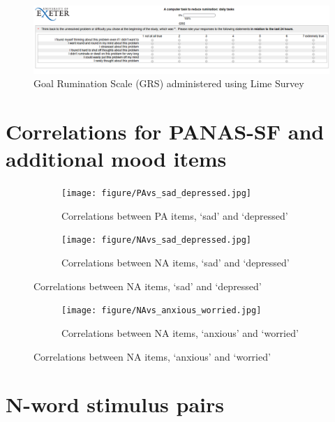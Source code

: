 \documentclass[man,floatsintext,a4paper,biblatex]{apa6}\usepackage[]{graphicx}\usepackage[]{color}
\begin{document}
\begin{figure}
\includegraphics[width=250mm]{figure/grs.png}
\caption{Goal Rumination Scale (GRS) administered using Lime Survey}
\end{figure}

\section{Correlations for PANAS-SF and additional mood items}
\label{app:mood}

\begin{figure}[!htbp]
\caption{Correlations PANAS-SF and additional items `sad',`depressed',`anxious',`worried'.}
\centering
  \begin{subfigure}[!htbp]{\textwidth}
    \texttt{[image: figure/PAvs\_sad\_depressed.jpg]}
    \caption{Correlations between PA items, `sad' and `depressed'}
  \end{subfigure}
  \begin{subfigure}[!htbp]{\textwidth}
    \texttt{[image: figure/NAvs\_sad\_depressed.jpg]}
    \caption{Correlations between NA items, `sad' and `depressed'}
  \end{subfigure}
\end{figure}

\begin{figure}
\ContinuedFloat
\centering
  \begin{subfigure}[!htbp]{\textwidth}
    \texttt{[image: figure/NAvs\_anxious\_worried.jpg]}
    \caption{Correlations between NA items, `anxious' and `worried'}
  \end{subfigure}
\end{figure}

\section{N-word stimulus pairs}
\label{app:nwords}
\end{document}
